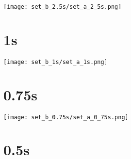 \documentclass{article}
\begin{document}
    \begin{center}
    \texttt{[image: set\_b\_2.5s/set\_a\_2\_5s.png]}
    \end{center}
\clearpage

\section{1s}
    \noindent\begin{minipage}{.45\textwidth}
    
    \end{minipage}\hfill
    \begin{minipage}{.45\textwidth}
    
    \end{minipage}
    
    \begin{center}
    \texttt{[image: set\_b\_1s/set\_a\_1s.png]}
    \end{center}
\clearpage

\section{0.75s}
    \noindent\begin{minipage}{.45\textwidth}
    
    \end{minipage}\hfill
    \begin{minipage}{.45\textwidth}
    
    \end{minipage}
    
    \begin{center}
    \texttt{[image: set\_b\_0.75s/set\_a\_0\_75s.png]}
    \end{center}
\clearpage

\section{0.5s}
    \noindent\begin{minipage}{.45\textwidth}
    
    \end{minipage}\hfill
    \begin{minipage}{.45\textwidth}
    
    \end{minipage}
    
\end{document}
